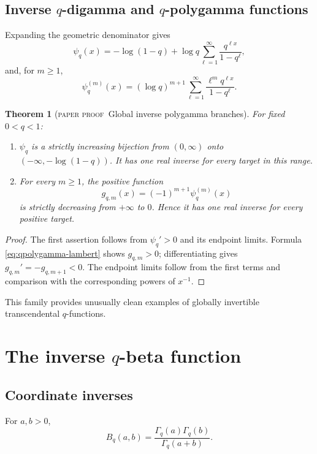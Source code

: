 \documentclass[11pt,oneside]{article}
\newtheorem{theorem}{Theorem}[section]
\theoremstyle{definition}
\theoremstyle{remark}
\theoremstyle{plain}
\theoremstyle{definition}
\theoremstyle{remark}
\newcommand{\statusproved}{\textcolor{provedgreen}{\textsc{paper proof}}}
\numberwithin{equation}{section}
\numberwithin{figure}{section}
\numberwithin{table}{section}
\let\reporttopsection\section
\let\reportsubsection\subsection
\let\reportsubsubsection\subsubsection
\let\chapter\reporttopsection
\let\section\reportsubsection
\let\subsection\reportsubsubsection
\begin{document}
\section{Inverse \texorpdfstring{\(q\)}{q}-digamma and
\texorpdfstring{\(q\)}{q}-polygamma functions}
Expanding the geometric denominator gives
\begin{equation}
 \psi_q(x)=-\log(1-q)+\log q
 \sum_{\ell=1}^\infty\frac{q^{\ell x}}{1-q^\ell},
 \label{eq:qdigamma-lambert}
\end{equation}
and, for \(m\ge1\),
\begin{equation}
 \psi_q^{(m)}(x)=(\log q)^{m+1}
 \sum_{\ell=1}^\infty\frac{\ell^m q^{\ell x}}{1-q^\ell}.
 \label{eq:qpolygamma-lambert}
\end{equation}

\begin{theorem}[\statusproved\ Global inverse polygamma branches]
For fixed \(0<q<1\):
\begin{enumerate}[label=(\roman*)]
\item \(\psi_q\) is a strictly increasing bijection from \((0,\infty)\) onto
\(( -\infty,-\log(1-q))\).  It has one real inverse for every target in this
range.
\item For every \(m\ge1\), the positive function
\[
 g_{q,m}(x)=(-1)^{m+1}\psi_q^{(m)}(x)
\]
is strictly decreasing from \(+\infty\) to \(0\).  Hence it has one real
inverse for every positive target.
\end{enumerate}
\end{theorem}
\begin{proof}
The first assertion follows from \(\psi_q'>0\) and its endpoint limits.  Formula
\eqref{eq:qpolygamma-lambert} shows \(g_{q,m}>0\); differentiating gives
\(g_{q,m}'=-g_{q,m+1}<0\).  The endpoint limits follow from the first terms and
comparison with the corresponding powers of \(x^{-1}\).
\end{proof}

This family provides unusually clean examples of globally invertible
transcendental \(q\)-functions.

\chapter{The inverse \texorpdfstring{\(q\)}{q}-beta function}

\section{Coordinate inverses}
For \(a,b>0\),
\[
 B_q(a,b)=\frac{\Gamma_q(a)\Gamma_q(b)}{\Gamma_q(a+b)}.
\]
\end{document}
